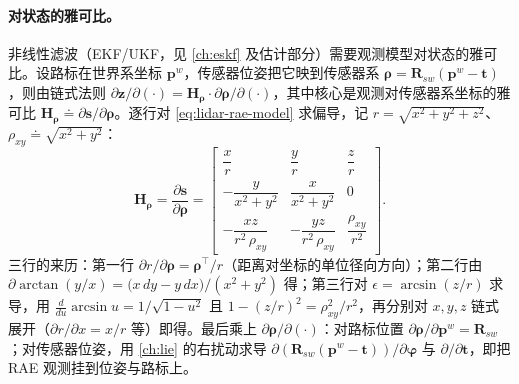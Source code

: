 \paragraph{对状态的雅可比。}
非线性滤波（EKF/UKF，见 \cref{ch:eskf} 及估计部分）需要观测模型对状态的雅可比。设路标在世界系坐标 $\mathbf p^w$，传感器位姿把它映到传感器系 $\boldsymbol\rho=\mathbf R_{sw}(\mathbf p^w-\mathbf t)$，则由链式法则 $\partial\mathbf z/\partial(\cdot)=\mathbf H_{\boldsymbol\rho}\cdot\partial\boldsymbol\rho/\partial(\cdot)$，其中核心是观测对传感器系坐标的雅可比 $\mathbf H_{\boldsymbol\rho}\doteq\partial\mathbf s/\partial\boldsymbol\rho$。逐行对 \cref{eq:lidar-rae-model} 求偏导，记 $r=\sqrt{x^2+y^2+z^2}$、$\rho_{xy}\doteq\sqrt{x^2+y^2}$：
\begin{equation}
  \mathbf H_{\boldsymbol\rho}=\frac{\partial\mathbf s}{\partial\boldsymbol\rho}
  =\begin{bmatrix}
   \dfrac{x}{r} & \dfrac{y}{r} & \dfrac{z}{r}\\[10pt]
   -\dfrac{y}{x^2+y^2} & \dfrac{x}{x^2+y^2} & 0\\[10pt]
   -\dfrac{xz}{r^2\,\rho_{xy}} & -\dfrac{yz}{r^2\,\rho_{xy}} & \dfrac{\rho_{xy}}{r^2}
  \end{bmatrix}.
  \label{eq:lidar-rae-jac}
\end{equation}
三行的来历：第一行 $\partial r/\partial\boldsymbol\rho=\boldsymbol\rho^\top/r$（距离对坐标的单位径向方向）；第二行由 $\partial\arctan(y/x)=\big(x\,dy-y\,dx\big)/(x^2+y^2)$ 得；第三行对 $\epsilon=\arcsin(z/r)$ 求导，用 $\tfrac{d}{du}\arcsin u=1/\sqrt{1-u^2}$ 且 $1-(z/r)^2=\rho_{xy}^2/r^2$，再分别对 $x,y,z$ 链式展开（$\partial r/\partial x=x/r$ 等）即得。最后乘上 $\partial\boldsymbol\rho/\partial(\cdot)$：对路标位置 $\partial\boldsymbol\rho/\partial\mathbf p^w=\mathbf R_{sw}$；对传感器位姿，用 \cref{ch:lie} 的右扰动求导 $\partial(\mathbf R_{sw}(\mathbf p^w-\mathbf t))/\partial\boldsymbol\varphi$ 与 $\partial/\partial\mathbf t$，即把 RAE 观测挂到位姿与路标上。

